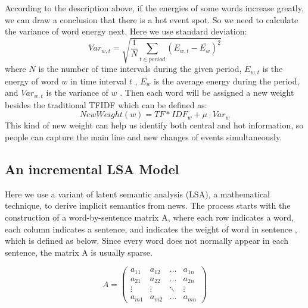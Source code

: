 \documentclass[runningheads,a4paper]{llncs}
\begin{document}
According to the description above, if the energies of some words increase greatly, we can draw a conclusion that there is a hot event spot. So we need to calculate the variance of word energy next. Here we use standard deviation:
\begin{equation}
Var_{w,t} = \sqrt{ \frac{1}{N} \sum_{t \in period}(E_{w,t}- \overline{E_{w}})^2}
\end{equation}
where $N$ is the number of time intervals during the given period, $E_{w,t}$  is the energy of word $w$  in time interval $t$ , $\overline{E_{w}}$  is the average energy during the period, and $Var_{w,t}$  is the variance of $w$ .
Then each word will be assigned a new weight besides the traditional TFIDF which can be defined as:
 \begin{equation}
NewWeight(w)=TF*IDF_{w} + \mu \cdot Var_{w}
\end{equation}
This kind of new weight can help us identify both central and hot information, so people can capture the main line and new changes of events simultaneously.

\subsection{An incremental LSA Model}
\label{lsasection}
Here we use a variant of latent semantic analysis (LSA), a mathematical technique, to derive implicit semantics from news. The process starts with the construction of a word-by-sentence matrix A, where each row indicates a word, each column indicates a sentence, and   indicates the weight of word   in sentence , which is defined as below. Since every word does not normally appear in each sentence, the matrix A is usually sparse.

\begin{displaymath}
A = 
\left( \begin{array}{cccc}
a_{11} & a_{12} & \ldots & a_{1n} \\
a_{21} & a_{22} & \ldots & a_{2n} \\
\vdots & \vdots & \ddots & \vdots \\
a_{m1} & a_{m2} & \ldots & a_{mn}
\end{array} \right)
\end{displaymath}
\end{document}
